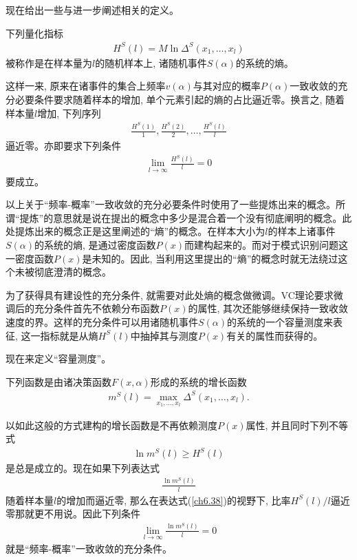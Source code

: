 现在给出一些与进一步阐述相关的定义。

\begin{definition}\citep{vapnik1998}
下列量化指标
\begin{align}
H^{S}(l)=M \ln \Delta^{S}\left(x_{1}, \ldots, x_{l}\right)
\end{align}
被称作是在样本量为$l$的随机样本上, 诸随机事件$S(\alpha)$的系统的\textsf{熵}。
\end{definition}

这样一来, 原来在诸事件的集合上频率$v(\alpha)$与其对应的概率$P(\alpha)$一致收敛的充分必要条件要求随着样本的增加, 单个元素引起的熵的占比逼近零。换言之, 随着样本量$l$增加, 下列序列
\begin{align}
\frac{H^{S}(1)}{1}, \frac{H^{S}(2)}{2}, \ldots, \frac{H^{S}(l)}{l}
\end{align}
逼近零。亦即要求下列条件
\begin{align}\label{ch6.37}
\lim _{l \rightarrow \infty} \frac{H^{S}(l)}{l}=0
\end{align}
要成立。

以上关于“频率-概率”一致收敛的充分必要条件时使用了一些提炼出来的概念。所谓“提炼”的意思就是说在提出的概念中多少是混合着一个没有彻底阐明的概念。此处提炼出来的概念正是这里阐述的“熵”的概念。在样本大小为$l$的样本上诸事件$S(\alpha)$的系统的熵, 是通过密度函数$P(x)$而建构起来的\citep{Kullback1968}。而对于模式识别问题这一密度函数$P(x)$是未知的。因此, 当利用这里提出的“熵”的概念时就无法绕过这个未被彻底澄清的概念。

为了获得具有建设性的充分条件, 就需要对此处熵的概念做微调。VC理论要求微调后的充分条件首先不依赖分布函数$P(x)$的属性, 其次还能够继续保持一致收敛速度的界。这样的充分条件可以用诸随机事件$S(\alpha)$的系统的一个容量测度来表征, 这一指标就是从熵$H^{S}(l)$中抽掉其与测度$P(x)$有关的属性而获得的。

现在来定义“容量测度”。

\begin{definition}\citep{vapnik1998}
下列函数是由诸决策函数$F(x,\alpha)$形成的系统的增长函数
\begin{align}
m^{S}(l)=\max _{x_{1}, \ldots, x_{l}} \Delta^{S}\left(x_{1}, \ldots, x_{l}\right).
\end{align}
\end{definition}

以如此这般的方式建构的增长函数是不再依赖测度$P(x)$属性, 并且同时下列不等式
\begin{align}\label{ch6.38}
\ln m^{S}(l) \geq H^{S}(l)
\end{align}
是总是成立的。现在如果下列表达式
\begin{align}
\frac{\ln m^{S}(l)}{l}
\end{align}
随着样本量$l$的增加而逼近零, 那么在表达式(\ref{ch6.38})的视野下, 比率$H^{S}(l)/l$逼近零那就更不用说。因此下列条件
\begin{align}
\lim _{l \rightarrow \infty} \frac{\ln m^{S}(l)}{l}=0
\end{align}
就是“频率-概率”一致收敛的充分条件\citep{vapnik1998,Alexey2015,Novoseltsev2015}。

